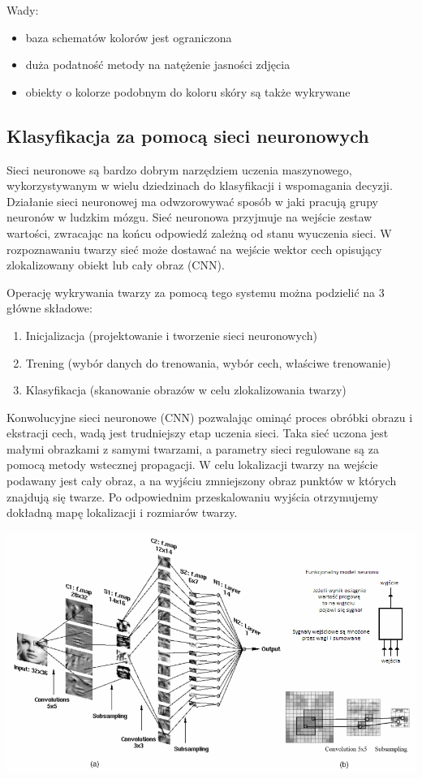 \documentclass[11pt,a4paper]{article}
\begin{document}
\noindent Wady:
\begin{itemize}
\item baza schematów kolorów jest ograniczona
\item duża podatność metody na natężenie jasności zdjęcia
\item obiekty o kolorze podobnym do koloru skóry są także wykrywane
\end{itemize}

\subsection{Klasyfikacja za pomocą sieci neuronowych}

Sieci neuronowe są bardzo dobrym narzędziem uczenia maszynowego, wykorzystywanym w wielu dziedzinach do klasyfikacji i wspomagania decyzji. Działanie sieci neuronowej ma odwzorowywać sposób w jaki pracują grupy neuronów w ludzkim mózgu. Sieć neuronowa przyjmuje na wejście zestaw wartości, zwracając na końcu odpowiedź zależną od stanu wyuczenia sieci. W rozpoznawaniu twarzy sieć może dostawać na wejście wektor cech opisujący zlokalizowany obiekt lub cały obraz (CNN).

Operację wykrywania twarzy za pomocą tego systemu można podzielić na 3 główne składowe:
\begin{enumerate}
\item Inicjalizacja (projektowanie i tworzenie sieci neuronowych)
\item Trening (wybór danych do trenowania, wybór cech, właściwe trenowanie)
\item Klasyfikacja (skanowanie obrazów w celu zlokalizowania twarzy)
\end{enumerate}

\noindent 
Konwolucyjne sieci neuronowe (CNN) pozwalając ominąć proces obróbki obrazu i ekstracji cech, wadą jest trudniejszy etap uczenia sieci. Taka sieć uczona jest małymi obrazkami z samymi twarzami, a parametry sieci regulowane są za pomocą metody wstecznej propagacji. W celu lokalizacji twarzy na wejście podawany jest cały obraz, a na wyjściu zmniejszony obraz punktów w których znajdują się twarze. Po odpowiednim przeskalowaniu wyjścia otrzymujemy dokładną mapę lokalizacji i rozmiarów twarzy.

\vspace*{1cm}
\includegraphics[scale=0.65]{cnn.png}
\vspace*{1cm}
\end{document}
